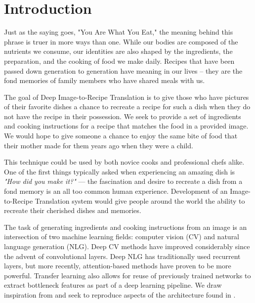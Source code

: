 \documentclass[10pt,twocolumn,letterpaper]{article}
\begin{document}
\section{Introduction}

Just as the saying goes, "You Are What You Eat," the meaning behind this phrase is truer in more ways than one. While our bodies are composed of the nutrients we consume, our identities are also shaped by the ingredients, the preparation, and the cooking of food we make daily. Recipes that have been passed down generation to generation have meaning in our lives – they are the fond memories of family members who have shared meals with us. 


The goal of Deep Image-to-Recipe Translation is to give those who have pictures of their favorite dishes a chance to recreate a recipe for such a dish when they do not have the recipe in their possession. We seek to provide a set of ingredients and cooking instructions for a recipe that matches the food in a provided image. We would hope to give someone a chance to enjoy the same bite of food that their mother made for them years ago when they were a child.

This technique could be used by both novice cooks and professional chefs alike. One of the first things typically asked when experiencing an amazing dish is \emph{"How did you make it?"} --- the fascination and desire to recreate a dish from a fond memory is an all too common human experience. Development of an Image-to-Recipe Translation system would give people around the world the ability to recreate their cherished dishes and memories.

The task of generating ingredients and cooking instructions from an image is an intersection of two machine learning fields: computer vision (CV) and natural language generation (NLG). Deep CV methods have improved considerably since the advent of convolutional layers. Deep NLG has traditionally used recurrent layers, but more recently, attention-based methods have proven to be more powerful. Transfer learning also allows for reuse of previously trained networks to extract bottleneck features as part of a deep learning pipeline. We draw inspiration from and seek to reproduce aspects of the architecture found in \cite{Salvador_Drozdzal_Giro-i-Nieto_Romero_2019_orig_2}.
\end{document}
